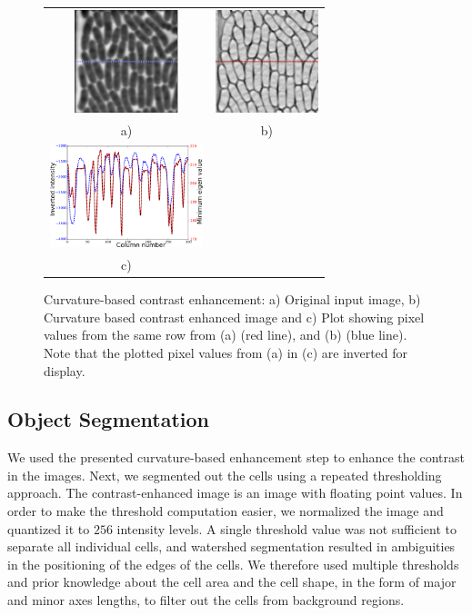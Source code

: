 \documentclass[journal]{IEEEtran}
\begin{document}
\begin{figure}[h]
	\begin{center}
		\begin{tabular}{cc}
			\includegraphics[height=3cm]{orimgmark.png}&\includegraphics[height=3cm]{eigenmark.png}\\
			a) & b)\\
			 \includegraphics[height=3cm]{combineplots.png} &	\\
			 c)&
		\end{tabular}
		\caption{Curvature-based contrast enhancement: a) Original input image, b) Curvature based contrast enhanced image and c) Plot showing pixel values from the same row from (a) (red line), and (b) (blue line). Note that the plotted pixel values from (a) in (c) are inverted for display.}
		\label{fig:contrastenhance}
	\end{center}
\end{figure}


\subsection{Object Segmentation}
We used the presented curvature-based enhancement step to enhance the contrast in the images. Next, we segmented out the cells using a repeated thresholding approach. The contrast-enhanced image is an image with floating point values. In order to make the threshold computation easier, we normalized the image and quantized it to $256$ intensity levels. A single threshold value was not sufficient to separate all individual cells, and watershed segmentation resulted in ambiguities in the positioning of the edges of the cells. We therefore used multiple thresholds and prior knowledge about the cell area and the cell shape, in the form of major and minor axes lengths,  to filter out the cells from background regions. 
\end{document}
